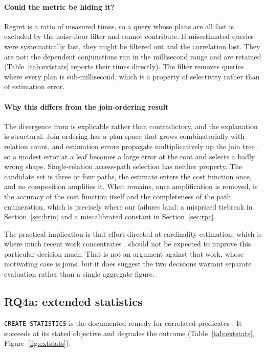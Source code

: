 \documentclass[preprint,12pt,authoryear]{elsarticle}
\begin{document}
\paragraph{Could the metric be hiding it?}
Regret is a ratio of measured times, so a query whose plans are all
fast is excluded by the noise-floor filter and cannot contribute. If
misestimated queries were systematically fast, they might be filtered
out and the correlation lost. They are not: the dependent conjunctions
run in the millisecond range and are retained (Table~\ref{tab:extstats}
reports their times directly). The filter removes queries where every
plan is sub-millisecond, which is a property of selectivity rather than
of estimation error.

\paragraph{Why this differs from the join-ordering result}
The divergence from \citet{leis2015good} is explicable rather than
contradictory, and the explanation is structural. Join ordering has a
plan space that grows combinatorially with relation count, and
estimation errors propagate multiplicatively up the join tree
\citep{ioannidis1991propagation}, so a modest error at a leaf becomes a
large error at the root and selects a badly wrong shape. Single-relation
access-path selection has neither property. The candidate set is three
or four paths, the estimate enters the cost function once, and no
composition amplifies it. What remains, once amplification is removed,
is the accuracy of the cost function itself and the completeness of the
path enumeration, which is precisely where our failures land: a
mispriced tiebreak in Section~\ref{sec:brin} and a miscalibrated
constant in Section~\ref{sec:rpc}.

The practical implication is that effort directed at cardinality
estimation, which is where much recent work concentrates
\citep{han2021cardinality, negi2021flow}, should not be expected to
improve this particular decision much. That is not an argument against
that work, whose motivating case is joins, but it does suggest the two
decisions warrant separate evaluation rather than a single aggregate
figure.

\subsection{RQ4a: extended statistics}
\label{sec:extstats}

\texttt{CREATE STATISTICS} is the documented remedy for correlated
predicates \citep{pgdocs17createstats}. It succeeds at its stated
objective and degrades the outcome (Table~\ref{tab:extstats},
Figure~\ref{fig:extstats}).
\end{document}
